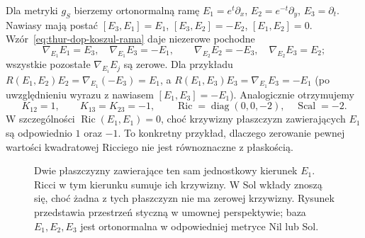 \begin{przyklad}
\label{prz:thur-dop-krzywizna-sol}
Dla metryki $g_S$ bierzemy ortonormalną ramę
$E_1=e^t\partial_x$, $E_2=e^{-t}\partial_y$,
$E_3=\partial_t$. Nawiasy mają postać
$[E_3,E_1]=E_1$, $[E_3,E_2]=-E_2$,
$[E_1,E_2]=0$. Wzór~\eqref{eq:thur-dop-koszul-rama}
daje niezerowe pochodne
\[
\nabla_{E_1}E_1=E_3,\quad \nabla_{E_1}E_3=-E_1,
\qquad \nabla_{E_2}E_2=-E_3,\quad
\nabla_{E_2}E_3=E_2;
\]
wszystkie pozostałe $\nabla_{E_i}E_j$ są zerowe.
Dla przykładu
$R(E_1,E_2)E_2=\nabla_{E_1}(-E_3)=E_1$,
a $R(E_1,E_3)E_3=\nabla_{E_1}E_3=-E_1$
(po uwzględnieniu wyrazu z nawiasem $[E_1,E_3]=-E_1$).
Analogicznie otrzymujemy
\[
 K_{12}=1,\qquad K_{13}=K_{23}=-1,
 \qquad \operatorname{Ric}=\operatorname{diag}(0,0,-2),
 \quad \operatorname{Scal}=-2.
\]
W szczególności $\operatorname{Ric}(E_1,E_1)=0$,
choć krzywizny płaszczyzn zawierających $E_1$
są odpowiednio $1$ oraz $-1$. To konkretny
przykład, dlaczego zerowanie pewnej wartości kwadratowej
Ricciego nie jest równoznaczne z płaskością.
\end{przyklad}

\begin{figure}[H]
\centering
{}
\caption{Dwie płaszczyzny zawierające ten sam jednostkowy
kierunek $E_1$. Ricci w tym kierunku sumuje ich krzywizny.
W Sol wkłady znoszą się, choć żadna z tych płaszczyzn
nie ma zerowej krzywizny. Rysunek przedstawia przestrzeń styczną
w umownej perspektywie; baza $E_1,E_2,E_3$ jest ortonormalna
w odpowiedniej metryce Nil lub Sol.}
\label{fig:ricci-nil-sol-suma}
\end{figure}

